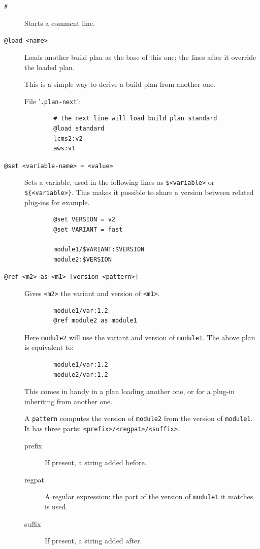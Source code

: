 \documentclass[a4paper,12pt,twoside]{article}
\newcommand{\code}[1]{\texttt{#1}}
\newcommand{\file}[1]{'{\texttt{#1}}'}
\begin{document}
\begin{description}
	\item[\code{\#}] Starts a comment line.

	\item[\code{@load <name>}] Loads another build plan as the base of this one; the lines after it override the loaded plan.

	This is a simple way to derive a build plan from another one.

	File \file{.plan-next}:

	\begin{lstlisting}
		# the next line will load build plan standard
		@load standard
		lcms2:v2
		aws:v1
	\end{lstlisting}

	\item[\code{@set <variable-name> = <value>}] Sets a variable, used in the following lines as \code{\$<variable>} or \code{\$\{<variable>\}}. This makes it possible to share a version between related plug-ins for example.

	\begin{lstlisting}
		@set VERSION = v2
		@set VARIANT = fast

		module1/$VARIANT:$VERSION
		module2:$VERSION
	\end{lstlisting}

	\item[\code{@ref <m2> as <m1> [version <pattern>]}] Gives \code{<m2>} the variant and version of \code{<m1>}.

	\begin{lstlisting}
		module1/var:1.2
		@ref module2 as module1
	\end{lstlisting}

	Here \code{module2} will use the variant and version of \code{module1}. The above plan is equivalent to:

	\begin{lstlisting}
		module1/var:1.2
		module2/var:1.2
	\end{lstlisting}

	This comes in handy in a plan loading another one, or for a plug-in inheriting from another one.

	A \code{pattern} computes the version of \code{module2} from the version of \code{module1}. It has three parts: \code{<prefix>/<regpat>/<suffix>}.

	\begin{description}
		\item[prefix] If present, a string added before.
		\item[regpat] A regular expression: the part of the version of \code{module1} it matches is used.
		\item[suffix] If present, a string added after.
	\end{description}


\end{description}
\end{document}
